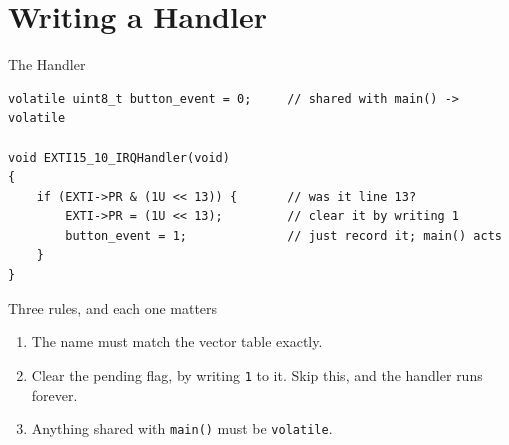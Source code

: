 \documentclass[9pt,aspectratio=169,xcolor=table]{beamer}
\begin{document}
\section{Writing a Handler}

\begin{frame}[fragile]{The Handler}
\begin{lstlisting}[style=myc, basicstyle=\ttfamily\small]
volatile uint8_t button_event = 0;     // shared with main() -> volatile

void EXTI15_10_IRQHandler(void)
{
    if (EXTI->PR & (1U << 13)) {       // was it line 13?
        EXTI->PR = (1U << 13);         // clear it by writing 1
        button_event = 1;              // just record it; main() acts
    }
}
\end{lstlisting}

    \vspace{5mm}
    \begin{block}{Three rules, and each one matters}
        \begin{enumerate}
            \item The \alert{name} must match the vector table exactly.
            \item \alert{Clear the pending flag}, by writing \texttt{1} to
                  it. Skip this, and the handler runs forever.
            \item Anything shared with \texttt{main()} must be
                  \alert{\texttt{volatile}}.
        \end{enumerate}
    \end{block}
\end{frame}
\end{document}
